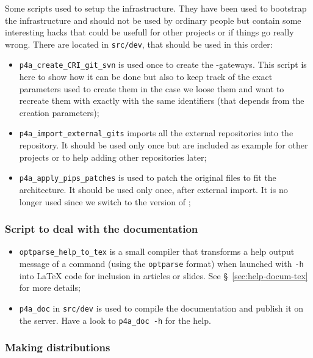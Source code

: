 \documentclass[a4paper]{article}
\begin{document}
Some scripts used to setup the infrastructure. They have been used to
bootstrap the \Apfa infrastructure and should not be used by ordinary
people but contain some interesting hacks that could be usefull for other
projects or if things go really wrong. There are located in
\texttt{src/dev}, that should be used in this order:
\begin{itemize}
\item \verb/p4a_create_CRI_git_svn/ is used once to create the \Apips{}
  \Asvn-\Agit gateways. This script is here to show how it can be done but
  also to keep track of the exact parameters used to create them in the
  case we loose them and want to recreate them with exactly with the same
  identifiers (that depends from the creation parameters);
\item \verb/p4a_import_external_gits/ imports all the external \Agit
  repositories into the \Apfa{} \Agit repository. It should be used only
  once but are included as example for other projects or to help adding
  other repositories later;
\item \verb/p4a_apply_pips_patches/ is used to patch the original \Apips
  files to fit the \Apfa architecture. It should be used only once, after
  external \Agit import. It is no longer used since we switch to the
  \Aautotools version of \Apips;
\end{itemize}


\subsubsection{Script to deal with the documentation}
\label{sec:script-deal-with}

\begin{itemize}
\item \verb|optparse_help_to_tex| is a small compiler that transforms a
  help output message of a command (using the \texttt{optparse} format)
  when launched with \texttt{-h} into La\TeX{} code for inclusion in
  articles or slides. See \S~\ref{sec:help-docum-tex} for more details;
\item \verb|p4a_doc| in \verb|src/dev| is used to compile the \Apfa
  documentation and publish it on the server. Have a look to
  \texttt{p4a\_doc -h} for the help.
\end{itemize}


\subsubsection{Making distributions}
\label{sec:making-distributions}
\end{document}
